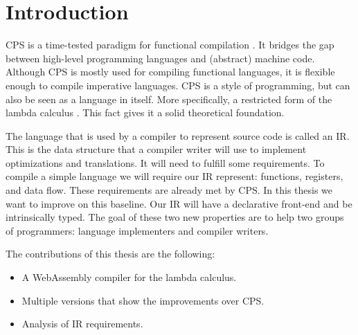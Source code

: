 
\chapter{\label{chap:introduction}Introduction}

\ac{CPS} is a time-tested paradigm for functional compilation \autocite{steele1978rabbit, DBLP:books/daglib/0022396}. It bridges the gap between high-level programming languages and (abstract) machine code. Although \ac{CPS} is mostly used for compiling functional languages, it is flexible enough to compile imperative languages. \ac{CPS} is a style of programming, but can also be seen as a language in itself. More specifically, a restricted form of the lambda calculus \autocite{barendregt1984lambda}. This fact gives it a solid theoretical foundation.

The language that is used by a compiler to represent source code is called an \ac{IR}. This is the data structure that a compiler writer will use to implement optimizations and translations. It will need to fulfill some requirements. To compile a simple language we will require our \ac{IR} represent: functions, registers, and data flow. These requirements are already met by \ac{CPS}. In this thesis we want to improve on this baseline. Our \ac{IR} will have a declarative front-end and be intrinsically typed. The goal of these two new properties are to help two groups of programmers: language implementers and compiler writers.

The contributions of this thesis are the following:
\begin{itemize}
\item A WebAssembly compiler for the lambda calculus.
\item Multiple versions that show the improvements over \ac{CPS}.
\item Analysis of \ac{IR} requirements.
\end{itemize}
